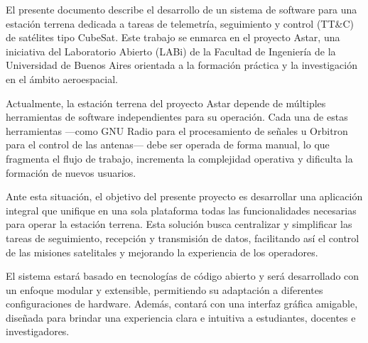 El presente documento describe el desarrollo de un sistema de software para una estación terrena dedicada a tareas de telemetría, seguimiento y control (TT\&C) de satélites tipo CubeSat. Este trabajo se enmarca en el proyecto Astar, una iniciativa del Laboratorio Abierto (LABi) de la Facultad de Ingeniería de la Universidad de Buenos Aires orientada a la formación práctica y la investigación en el ámbito aeroespacial.

Actualmente, la estación terrena del proyecto Astar depende de múltiples herramientas de software independientes para su operación. Cada una de estas herramientas —como GNU Radio para el procesamiento de señales u Orbitron para el control de las antenas— debe ser operada de forma manual, lo que fragmenta el flujo de trabajo, incrementa la complejidad operativa y dificulta la formación de nuevos usuarios.

Ante esta situación, el objetivo del presente proyecto es desarrollar una aplicación integral que unifique en una sola plataforma todas las funcionalidades necesarias para operar la estación terrena. Esta solución busca centralizar y simplificar las tareas de seguimiento, recepción y transmisión de datos, facilitando así el control de las misiones satelitales y mejorando la experiencia de los operadores.

El sistema estará basado en tecnologías de código abierto y será desarrollado con un enfoque modular y extensible, permitiendo su adaptación a diferentes configuraciones de hardware. Además, contará con una interfaz gráfica amigable, diseñada para brindar una experiencia clara e intuitiva a estudiantes, docentes e investigadores.
